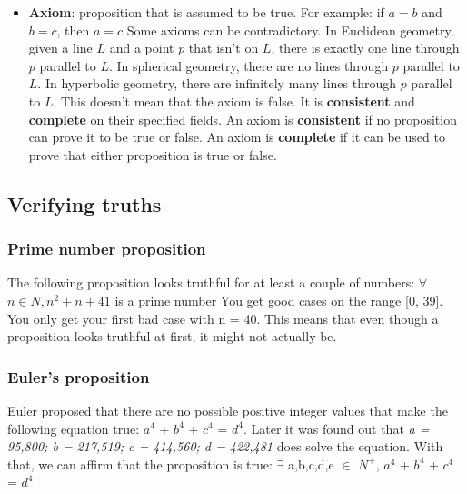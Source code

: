 \documentclass{article}
\begin{document}
\begin{itemize}
		\item \textbf{Axiom}: proposition that is assumed to be true. For example: \newline
		\indent if $a = b$ and $b = c$, then $a = c$\newline\newline
		Some axioms can be contradictory. In Euclidean geometry, given a line $L$ and a point $p$ that isn't on $L$, there is exactly one line through $p$ parallel to $L$.\newline
		In spherical geometry, there are no lines through $p$ parallel to $L$.\newline
		In hyperbolic geometry, there are infinitely many lines through $p$ parallel to $L$.\newline
		This doesn't mean that the axiom is false. It is \textbf{consistent} and \textbf{complete} on their specified fields.\newline
		An axiom is \textbf{consistent} if no proposition can prove it to be true or false.\newline
		An axiom is \textbf{complete} if it can be used to prove that either proposition is true or false.
	\end{itemize}
	\subsection{Verifying truths}
	\subsubsection{Prime number proposition}
	The following proposition looks truthful for at least a couple of numbers:\newline
	\indent $\forall$ $n \in N, n^2 + n + 41$ is a prime number\newline
	You get good cases on the range [0, 39]. You only get your first bad case with n = 40. This means that even though a proposition looks truthful at first, it might not actually be.
	\subsubsection{Euler's proposition}
	Euler proposed that there are no possible positive integer values that make the following equation true: $a^4$ + $b^4$ + $c^4$ = $d^4$. \newline
	Later it was found out that \textit{a = 95,800; b = 217,519; c = 414,560; d = 422,481} does solve the equation.
	With that, we can affirm that the proposition is true:\newline
	\indent $\exists$ a,b,c,d,e $\in$ $N^+$, $a^4$ + $b^4$ + $c^4$ = $d^4$
\end{document}
